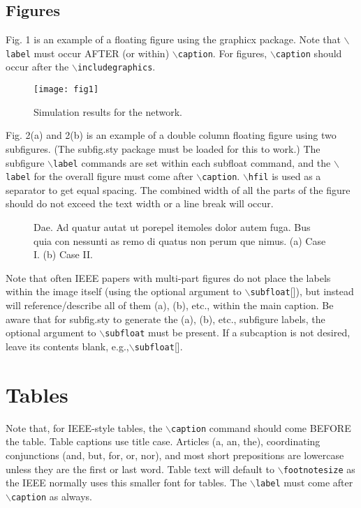 \documentclass[lettersize,journal]{IEEEtran}
\begin{document}
\subsection{Figures}
Fig. 1 is an example of a floating figure using the graphicx package.
 Note that $\backslash${\tt{label}} must occur AFTER (or within) $\backslash${\tt{caption}}.
 For figures, $\backslash${\tt{caption}} should occur after the $\backslash${\tt{includegraphics}}.

\begin{figure}[!t]
\centering
\texttt{[image: fig1]}
\caption{Simulation results for the network.}
\label{fig_1}
\end{figure}

Fig. 2(a) and 2(b) is an example of a double column floating figure using two subfigures.
 (The subfig.sty package must be loaded for this to work.)
 The subfigure $\backslash${\tt{label}} commands are set within each subfloat command,
 and the $\backslash${\tt{label}} for the overall figure must come after $\backslash${\tt{caption}}.
 $\backslash${\tt{hfil}} is used as a separator to get equal spacing.
 The combined width of all the parts of the figure should do not exceed the text width or a line break will occur.
%
\begin{figure*}[!t]
\centering
{}
\hfil
{}
\caption{Dae. Ad quatur autat ut porepel itemoles dolor autem fuga. Bus quia con nessunti as remo di quatus non perum que nimus. (a) Case I. (b) Case II.}
\label{fig_sim}
\end{figure*}

Note that often IEEE papers with multi-part figures do not place the labels within the image itself (using the optional argument to $\backslash${\tt{subfloat}}[]), but instead will
 reference/describe all of them (a), (b), etc., within the main caption.
 Be aware that for subfig.sty to generate the (a), (b), etc., subfigure
 labels, the optional argument to $\backslash${\tt{subfloat}} must be present. If a
 subcaption is not desired, leave its contents blank,
 e.g.,$\backslash${\tt{subfloat}}[].


 

\section{Tables}
Note that, for IEEE-style tables, the
 $\backslash${\tt{caption}} command should come BEFORE the table. Table captions use title case. Articles (a, an, the), coordinating conjunctions (and, but, for, or, nor), and most short prepositions are lowercase unless they are the first or last word. Table text will default to $\backslash${\tt{footnotesize}} as
 the IEEE normally uses this smaller font for tables.
 The $\backslash${\tt{label}} must come after $\backslash${\tt{caption}} as always.
 
\end{document}
